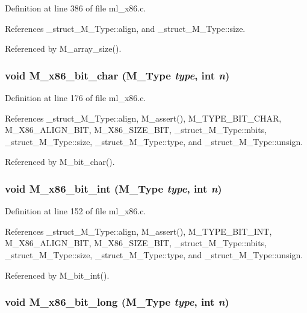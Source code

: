 Definition at line 386 of file ml\_\-x86.c.

References \_\-struct\_\-M\_\-Type::align, and \_\-struct\_\-M\_\-Type::size.

Referenced by M\_\-array\_\-size().
\subsubsection{\setlength{\rightskip}{0pt plus 5cm}void M\_\-x86\_\-bit\_\-char (\bf{M\_\-Type} {\em type}, int {\em n})}\label{ml__x86_8c_d01a3813dde73a5257b799e26f65066a}




Definition at line 176 of file ml\_\-x86.c.

References \_\-struct\_\-M\_\-Type::align, M\_\-assert(), M\_\-TYPE\_\-BIT\_\-CHAR, M\_\-X86\_\-ALIGN\_\-BIT, M\_\-X86\_\-SIZE\_\-BIT, \_\-struct\_\-M\_\-Type::nbits, \_\-struct\_\-M\_\-Type::size, \_\-struct\_\-M\_\-Type::type, and \_\-struct\_\-M\_\-Type::unsign.

Referenced by M\_\-bit\_\-char().
\subsubsection{\setlength{\rightskip}{0pt plus 5cm}void M\_\-x86\_\-bit\_\-int (\bf{M\_\-Type} {\em type}, int {\em n})}\label{ml__x86_8c_bf35d69768d22693fa9279fa7bde3f0b}




Definition at line 152 of file ml\_\-x86.c.

References \_\-struct\_\-M\_\-Type::align, M\_\-assert(), M\_\-TYPE\_\-BIT\_\-INT, M\_\-X86\_\-ALIGN\_\-BIT, M\_\-X86\_\-SIZE\_\-BIT, \_\-struct\_\-M\_\-Type::nbits, \_\-struct\_\-M\_\-Type::size, \_\-struct\_\-M\_\-Type::type, and \_\-struct\_\-M\_\-Type::unsign.

Referenced by M\_\-bit\_\-int().
\subsubsection{\setlength{\rightskip}{0pt plus 5cm}void M\_\-x86\_\-bit\_\-long (\bf{M\_\-Type} {\em type}, int {\em n})}\label{ml__x86_8c_b8150acbba1ed418ca4270bf08c272e9}




